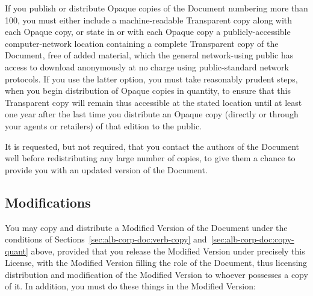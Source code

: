 \documentclass[11pt,a4paper,oneside]{article}
\begin{document}
\begin{albTitlePage}
If you publish or distribute Opaque copies of the Document numbering
more than 100, you must either include a machine-readable Transparent
copy along with each Opaque copy, or state in or with each Opaque copy a
publicly-accessible computer-network location containing a complete
Transparent copy of the Document, free of added material, which the
general network-using public has access to download anonymously at no
charge using public-standard network protocols.  If you use the latter
option, you must take reasonably prudent steps, when you begin
distribution of Opaque copies in quantity, to ensure that this
Transparent copy will remain thus accessible at the stated location
until at least one year after the last time you distribute an Opaque
copy (directly or through your agents or retailers) of that edition to
the public.

It is requested, but not required, that you contact the authors of the
Document well before redistributing any large number of copies, to give
them a chance to provide you with an updated version of the Document.


\subsection{Modifications}
\label{sec:alb-corp-doc:modif}

You may copy and distribute a Modified Version of the Document under the
conditions of Sections~\ref{sec:alb-corp-doc:verb-copy}
and~\ref{sec:alb-corp-doc:copy-quant} above, provided that you release
the Modified Version under precisely this License, with the Modified
Version filling the role of the Document, thus licensing distribution
and modification of the Modified Version to whoever possesses a copy of
it.  In addition, you must do these things in the Modified Version:


\end{albTitlePage}
\end{document}
